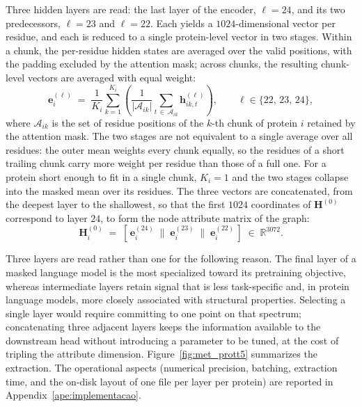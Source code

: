 \documentclass[Ingles]{ic-tese-v3}
\begin{document}
Three hidden layers are read: the last layer of the encoder, $\ell = 24$, and its two predecessors,
$\ell = 23$ and $\ell = 22$. Each yields a $1024$-dimensional vector per residue, and each is
reduced
to a single protein-level vector in two stages. Within a chunk, the per-residue hidden states are
averaged over the valid positions, with the padding excluded by the attention mask; across chunks,
the resulting chunk-level vectors are averaged with equal weight:
\begin{equation}
  \mathbf{e}^{(\ell)}_i \;=\; \frac{1}{K_i} \sum_{k=1}^{K_i}
  \left( \frac{1}{|\mathcal{A}_{ik}|}
  \sum_{t \,\in\, \mathcal{A}_{ik}} \mathbf{h}^{(\ell)}_{ik,t} \right),
  \qquad \ell \in \{22,\,23,\,24\},
  \label{eq:met_meanpool}
\end{equation}
\noindent where $\mathcal{A}_{ik}$ is the set of residue positions of the $k$-th chunk of protein $i$ retained
by the attention mask. The two stages are not equivalent to a single average over all residues: the
outer mean weights every chunk equally, so the residues of a short trailing chunk carry more weight
per residue than those of a full one. For a protein short enough to fit in a single chunk, $K_i = 1$
and the two stages collapse into the masked mean over its residues.
The three vectors are concatenated, from the deepest layer to the shallowest, so that the first
$1024$ coordinates of $\mathbf{H}^{(0)}$ correspond to layer $24$, to form the node attribute matrix
of the graph:
\begin{equation}
  \mathbf{H}^{(0)}_i \;=\;
  \left[\, \mathbf{e}^{(24)}_i \;\big\|\; \mathbf{e}^{(23)}_i \;\big\|\; \mathbf{e}^{(22)}_i \,\right]
  \;\in\; \mathbb{R}^{3072}.
  \label{eq:met_h0}
\end{equation}

Three layers are read rather than one for the following reason. The final layer of a masked language
model is the most specialized toward its pretraining objective, whereas intermediate layers retain
signal that is less task-specific and, in protein language models, more closely associated with
structural properties. Selecting a single layer would require committing to one point on that
spectrum; concatenating three adjacent layers keeps the information available to the downstream head
without introducing a parameter to be tuned, at the cost of tripling the attribute dimension.
Figure~\ref{fig:met_prott5} summarizes the extraction. The operational aspects (numerical precision,
batching, extraction time, and the on-disk layout of one file per layer per protein) are reported in
Appendix~\ref{ape:implementacao}.
\end{document}
